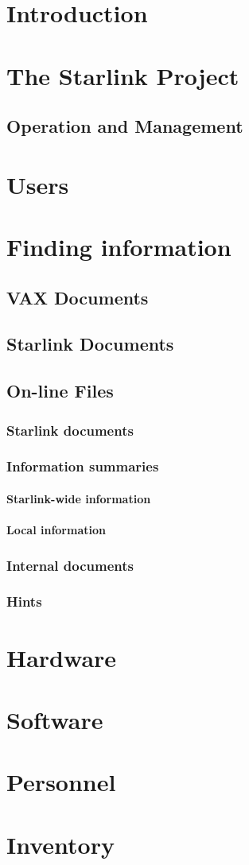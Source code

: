 \documentclass[11pt,twoside]{article}
\begin{document}
\section  {Introduction}
\section{The Starlink Project}
\subsection{Operation and Management}
\section{Users}
\section{Finding information}
\subsection{VAX Documents}
\subsection{Starlink Documents}
\subsection{On-line Files}
\subsubsection{Starlink documents}
\subsubsection{Information summaries}
\paragraph {Starlink-wide information}
\paragraph {Local information}
\subsubsection{Internal documents}
\subsubsection{Hints}
\section{Hardware}
\section{Software}
\appendix
\section{Personnel}
\section{Inventory}
\end{document}
